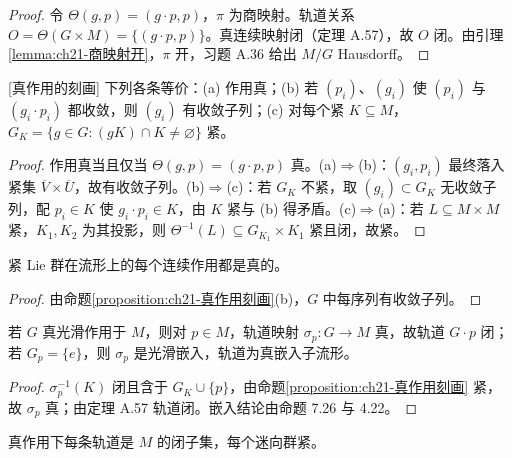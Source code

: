 \documentclass[../../main.tex]{subfiles}
\begin{document}
\begin{proof}
令 $\Theta(g,p)=(g\cdot p,p)$，$\pi$ 为商映射。轨道关系 $O=\Theta(G\times M)=\{(g\cdot p,p)\}$。真连续映射闭（定理 A.57），故 $O$ 闭。由引理\cref{lemma:ch21-商映射开}，$\pi$ 开，习题 A.36 给出 $M/G$ Hausdorff。
\end{proof}

\begin{proposition}{[真作用的刻画]}\label{proposition:ch21-真作用刻画}
下列各条等价：(a) 作用真；(b) 若 $(p_i)$、$(g_i)$ 使 $(p_i)$ 与 $(g_i\cdot p_i)$ 都收敛，则 $(g_i)$ 有收敛子列；(c) 对每个紧 $K\subseteq M$，$G_K=\{g\in G\colon(gK)\cap K\neq\varnothing\}$ 紧。
\end{proposition}

\begin{proof}
作用真当且仅当 $\Theta(g,p)=(g\cdot p,p)$ 真。(a)$\Rightarrow$(b)：$(g_i,p_i)$ 最终落入紧集 $\overline V\times\overline U$，故有收敛子列。(b)$\Rightarrow$(c)：若 $G_K$ 不紧，取 $(g_i)\subset G_K$ 无收敛子列，配 $p_i\in K$ 使 $g_i\cdot p_i\in K$，由 $K$ 紧与 (b) 得矛盾。(c)$\Rightarrow$(a)：若 $L\subseteq M\times M$ 紧，$K_1,K_2$ 为其投影，则 $\Theta^{-1}(L)\subseteq G_{K_1}\times K_1$ 紧且闭，故紧。
\end{proof}

\begin{corollary}\label{corollary:ch21-紧群真}
紧 Lie 群在流形上的每个连续作用都是真的。
\end{corollary}

\begin{proof}
由命题\cref{proposition:ch21-真作用刻画}(b)，$G$ 中每序列有收敛子列。
\end{proof}

\begin{proposition}\label{proposition:ch21-真作用轨道}
若 $G$ 真光滑作用于 $M$，则对 $p\in M$，轨道映射 $\sigma_p\colon G\to M$ 真，故轨道 $G\cdot p$ 闭；若 $G_p=\{e\}$，则 $\sigma_p$ 是光滑嵌入，轨道为真嵌入子流形。
\end{proposition}

\begin{proof}
$\sigma_p^{-1}(K)$ 闭且含于 $G_K\cup\{p\}$，由命题\cref{proposition:ch21-真作用刻画} 紧，故 $\sigma_p$ 真；由定理 A.57 轨道闭。嵌入结论由命题 7.26 与 4.22。
\end{proof}

\begin{corollary}\label{corollary:ch21-真作用轨道闭}
真作用下每条轨道是 $M$ 的闭子集，每个迷向群紧。
\end{corollary}
\end{document}

